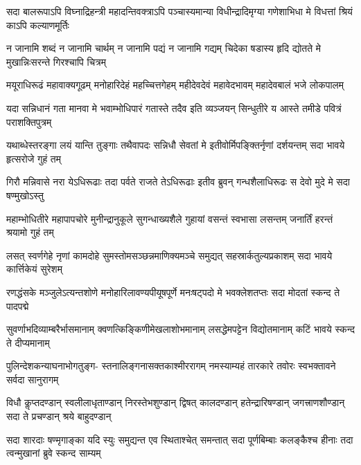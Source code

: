 
\fourlineindentedshloka
{सदा बालरूपाऽपि विघ्नाद्रिहन्त्री}
{महादन्तिवक्त्राऽपि पञ्चास्यमान्या}
{विधीन्द्रादिमृग्या गणेशाभिधा मे}
{विधत्तां श्रियं काऽपि कल्याणमूर्तिः}

\fourlineindentedshloka
{न जानामि शब्दं न जानामि चार्थम्}
{न जानामि पद्यं न जानामि गद्यम्}
{चिदेका षडास्य हृदि द्योतते मे}
{मुखान्निःसरन्ते गिरश्चापि चित्रम्}

\fourlineindentedshloka
{मयूराधिरूढं महावाक्यगूढम्}
{मनोहारिदेहं महच्चित्तगेहम्}
{महीदेवदेवं महावेदभावम्}
{महादेवबालं भजे लोकपालम्}

\fourlineindentedshloka
{यदा सन्निधानं गता मानवा मे}
{भवाम्भोधिपारं गतास्ते तदैव}
{इति व्यञ्जयन् सिन्धुतीरे य आस्ते}
{तमीडे पवित्रं पराशक्तिपुत्रम्}

\fourlineindentedshloka
{यथाब्धेस्तरङ्गा लयं यान्ति तुङ्गाः}
{तथैवापदः सन्निधौ सेवतां मे}
{इतीवोर्मिपङ्क्तिर्नृणां दर्शयन्तम्}
{सदा भावये हृत्सरोजे गुहं तम्}

\fourlineindentedshloka
{गिरौ मन्निवासे नरा येऽधिरूढाः}
{तदा पर्वते राजते तेऽधिरूढाः}
{इतीव ब्रुवन् गन्धशैलाधिरूढः}
{स देवो मुदे मे सदा षण्मुखोऽस्तु}

\fourlineindentedshloka
{महाम्भोधितीरे महापापचोरे}
{मुनीन्द्रानुकूले सुगन्धाख्यशैले}
{गुहायां वसन्तं स्वभासा लसन्तम्}
{जनार्तिं हरन्तं श्रयामो गुहं तम्}

\fourlineindentedshloka
{लसत् स्वर्णगेहे नृणां कामदोहे}
{सुमस्तोमसञ्छन्नमाणिक्यमञ्चे}
{समुद्यत् सहस्रार्कतुल्यप्रकाशम्}
{सदा भावये कार्त्तिकेयं सुरेशम्}

\fourlineindentedshloka
{रणद्धंसके मञ्जुलेऽत्यन्तशोणे}
{मनोहारिलावण्यपीयूषपूर्णे}
{मनःषट्पदो मे भवक्लेशतप्तः}
{सदा मोदतां स्कन्द ते पादपद्मे}

\fourlineindentedshloka
{सुवर्णाभदिव्याम्बरैर्भासमानाम्}
{क्वणत्किङ्किणीमेखलाशोभमानाम्}
{लसद्धेमपट्टेन विद्योतमानाम्}
{कटिं भावये स्कन्द ते दीप्यमानाम्}

\fourlineindentedshloka
{पुलिन्देशकन्याघनाभोगतुङ्ग-}
{स्तनालिङ्गनासक्तकाश्मीररागम्}
{नमस्याम्यहं तारकारे तवोरः}
{स्वभक्तावने सर्वदा सानुरागम्}

\fourlineindentedshloka
{विधौ कॢप्तदण्डान् स्वलीलाधृताण्डान्}
{निरस्तेभशुण्डान् द्विषत् कालदण्डान्}
{हतेन्द्रारिषण्डान् जगत्त्राणशौण्डान्}
{सदा ते प्रचण्डान् श्रये बाहुदण्डान्}

\fourlineindentedshloka
{सदा शारदाः षण्मृगाङ्का यदि स्युः}
{समुद्यन्त एव स्थिताश्चेत् समन्तात्}
{सदा पूर्णबिम्बाः कलङ्कैश्च हीनाः}
{तदा त्वन्मुखानां ब्रुवे स्कन्द साम्यम्}

